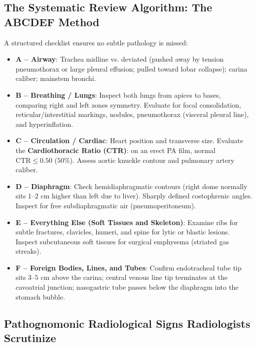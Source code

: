 \documentclass[11pt,a4paper]{article}
\begin{document}
\subsection{The Systematic Review Algorithm: The ABCDEF Method}
A structured checklist ensures no subtle pathology is missed:
\begin{itemize}
    \item \textbf{A -- Airway}: Trachea midline vs. deviated (pushed away by tension pneumothorax or large pleural effusion; pulled toward lobar collapse); carina caliber; mainstem bronchi.
    \item \textbf{B -- Breathing / Lungs}: Inspect both lungs from apices to bases, comparing right and left zones symmetry. Evaluate for focal consolidation, reticular/interstitial markings, nodules, pneumothorax (visceral pleural line), and hyperinflation.
    \item \textbf{C -- Circulation / Cardiac}: Heart position and transverse size. Evaluate the \textbf{Cardiothoracic Ratio (CTR)}: on an erect PA film, normal $\text{CTR} \le 0.50$ ($50\%$). Assess aortic knuckle contour and pulmonary artery caliber.
    \item \textbf{D -- Diaphragm}: Check hemidiaphragmatic contours (right dome normally sits $1\text{--}2\text{ cm}$ higher than left due to liver). Sharply defined costophrenic angles. Inspect for free subdiaphragmatic air (pneumoperitoneum).
    \item \textbf{E -- Everything Else (Soft Tissues and Skeleton)}: Examine ribs for subtle fractures, clavicles, humeri, and spine for lytic or blastic lesions. Inspect subcutaneous soft tissues for surgical emphysema (striated gas streaks).
    \item \textbf{F -- Foreign Bodies, Lines, and Tubes}: Confirm endotracheal tube tip sits $3\text{--}5\text{ cm}$ above the carina; central venous line tip terminates at the cavoatrial junction; nasogastric tube passes below the diaphragm into the stomach bubble.
\end{itemize}

\subsection{Pathognomonic Radiological Signs Radiologists Scrutinize}
\end{document}
